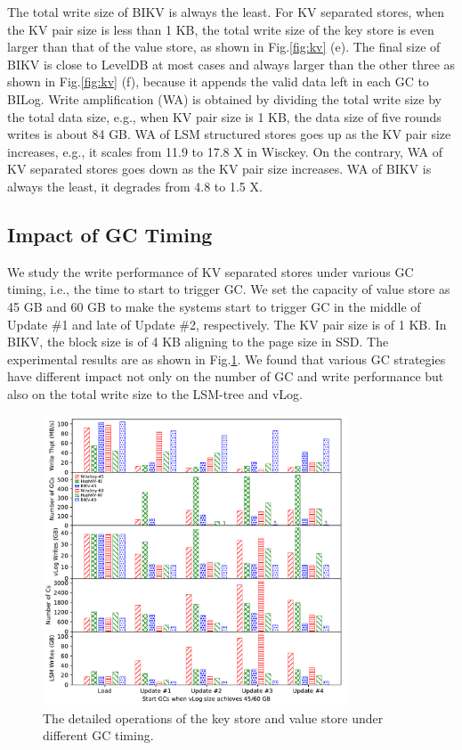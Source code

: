 \documentclass[sigconf]{acmart}
\begin{document}
The total write size of BIKV is always the least. For KV separated stores, when the KV pair size is less than 1 KB, the total write size of the key store is even larger than that of the value store, as shown in Fig.\ref{fig:kv} (e). The final size of BIKV is close to LevelDB at most cases and always larger than the other three as shown in Fig.\ref{fig:kv} (f), because it appends the valid data left in each GC to BILog. Write amplification (WA) is obtained by dividing the total write size by the total data size, e.g., when KV pair size is 1 KB, the data size of five rounds writes is about 84 GB. WA of LSM structured stores goes up as the KV pair size increases, e.g., it scales from 11.9 to 17.8 X in Wisckey. On the contrary, WA of KV separated stores goes down as the KV pair size increases. WA of BIKV is always the least, it degrades from 4.8 to 1.5 X.


\subsection{Impact of GC Timing}
We study the write performance of KV separated stores under various GC timing, i.e., the time to start to trigger GC. We set the capacity of value store as 45 GB and 60 GB to make the systems start to trigger GC in the middle of Update \#1 and late of Update \#2, respectively. The KV pair size is of 1 KB. In BIKV, the block size is of 4 KB aligning to the page size in SSD. The experimental results are as shown in Fig.\ref{fig:gc}. We found that various GC strategies have different impact not only on the number of GC and write performance but also on the total write size to the LSM-tree and vLog.

\begin{figure}[!t]
	\setlength{\abovecaptionskip}{0.cm}	
	\setlength{\belowcaptionskip}{-0.cm}
	\centering
	\includegraphics[width=90mm]{gc_timing.pdf}
	\caption{The detailed operations of the key store and value store under different GC timing.}
	\label{fig:gc}
\end{figure}
\end{document}
